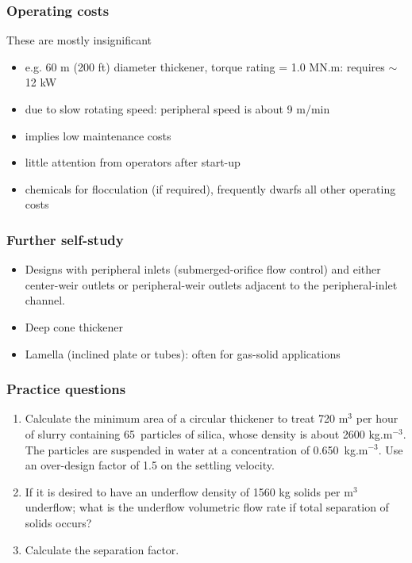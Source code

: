 \begin{frame}\frametitle{Operating costs}
	These are mostly insignificant
	\begin{itemize}
		\item	e.g. 60 m (200 ft) diameter thickener, torque rating = 1.0 MN.m: requires $\sim$ 12 kW
		\item	due to slow rotating speed: peripheral speed is about 9 m/min
		\item	implies low maintenance costs
		\item	little attention from operators after start-up
		\item	chemicals for flocculation (if required), frequently dwarfs all other operating costs 
	\end{itemize}
\end{frame}

\begin{frame}\frametitle{Further self-study}
	\begin{itemize}
		\item	Designs with peripheral inlets (submerged-orifice flow control) and either center-weir outlets or peripheral-weir outlets adjacent to the peripheral-inlet channel.
		\item	Deep cone thickener
		\item	Lamella (inclined plate or tubes): often for gas-solid applications
	\end{itemize}
\end{frame}

\begin{frame}\frametitle{Practice questions}
	\begin{enumerate}
		\item	Calculate the minimum area of a circular thickener to treat 720 $\text{m}^3$ per hour of slurry containing 65\micron~particles of silica, whose density is about 2600 kg.$\text{m}^{-3}$. The particles are suspended in water at a concentration of 0.650~kg.$\text{m}^{-3}$. Use an over-design factor of 1.5 on the settling velocity. \newline {\color{myOrange}[Ans: $v = 3.7/1.5~\text{mm.s}^{-1}$ and $A=81.4~\text{m}^{2}$]}
		\item	If it is desired to have an underflow density of 1560 kg solids per $\text{m}^{3}$ underflow; what is the underflow volumetric flow rate if total separation of solids occurs? \newline {\color{myOrange}[Ans: $Q_\text{under} = 0.3~\text{m}^3~\text{solids.hr}^{-1}$]}
		\item	Calculate the separation factor.
	\end{enumerate}
\end{frame}

